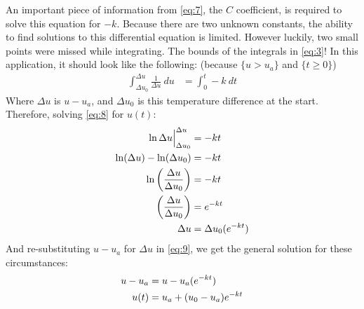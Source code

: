 \documentclass[10pt]{article}
\begin{document}
An important piece of information from \eqref{eq:7}, the $C$ coefficient, is required to solve this equation for $-k$. Because there are two unknown constants, the ability to find solutions to this differential equation is limited. However luckily, two small points were missed while integrating. The bounds of the integrals in \eqref{eq:3}! In this application, it should look like the following: (because $\lbrace u > u_a \rbrace$ and $\lbrace t \geqslant 0 \rbrace$)
	\begin{align}
	\int_{\Delta u_0}^{\Delta u} \frac{1}{\Delta u}\ du &= \int_{0}^{t} -k\ dt \label{eq:8}
	\end{align}
Where $\Delta u$ is $u-u_{a}$, and $\Delta u_0$ is this temperature difference at the start.\\Therefore, solving \eqref{eq:8} for $u(t)$:
	\begin{align}
	\ln  \Delta u \Big|_{\Delta u_0}^{\Delta u} &= -kt  \notag \\
	\ln (\Delta u) - \ln (\Delta u_0) &= -kt \notag \\
	\ln \bigg( \frac{  \Delta u  }{  \Delta u_0  } \bigg) &= -kt \notag \\
	\bigg( \frac{  \Delta u  }{  \Delta u_0  } \bigg) &= e^{-kt} \notag \\
	\Delta u &= \Delta u_0 (e^{-kt}) \label{eq:9}
	\end{align}
And re-substituting $u-u_{a}$ for $\Delta u$ in \eqref{eq:9}, we get the general solution for these circumstances:
	\begin{align}
	u-u_{a} &= u-u_{a} (e^{-kt})\notag\\
	u(t) &= u_{a}+(u_0-u_{a}) e^{-kt} \label{eq:10}
	\end{align}
\end{document}
